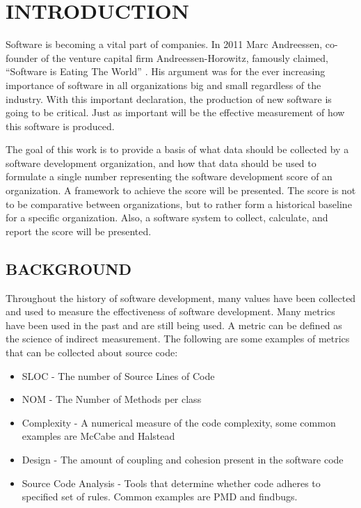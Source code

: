 \documentclass[SDSUThesis.tex]{subfiles}
\begin{document}
\newpage
{}
\setcounter{tocdepth}{2}

\section{INTRODUCTION}

Software is becoming a vital part of companies. In 2011 Marc Andreessen, co-founder of the venture capital firm Andreessen-Horowitz,
famously claimed, ``Software is Eating The World'' \cite{Andreessen2001}. His argument was for the ever increasing importance of software
in all organizations big and small regardless of the industry.  With this important declaration, the production of new software is
going to be critical.  Just as important will be the effective measurement of how this software is produced.  

The goal of this work is to provide a basis of what data should be collected by a software development organization, and how that data
should be used to formulate a single number representing the software development score of an organization. A framework to 
achieve the score will be presented.  The  score
is not to be comparative between organizations, but to rather form a historical baseline for a specific organization.  Also, a software
system to collect, calculate, and report the score will be presented.

\subsection{BACKGROUND}

Throughout the history of software development, many values have been collected and used to measure the effectiveness of software development. 
Many metrics have been used in the past and are still being used.  A metric can be defined as the science of indirect measurement.
The following are some examples of metrics that can be collected about source code:
\begin{itemize}
\item SLOC - The number of Source Lines of Code 
\item NOM - The Number of Methods per class
\item Complexity - A numerical measure of the code complexity, some common examples are McCabe \cite{McCabe1976} and Halstead \cite{Halstead1977}
\item Design - The amount of coupling and cohesion present in the software code
\item Source Code Analysis - Tools that determine whether code adheres to specified set of rules. Common examples are PMD and findbugs.
\end{itemize}
\end{document}
